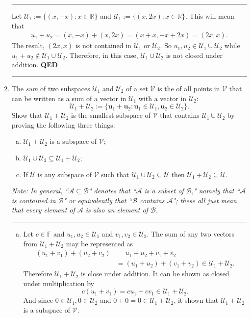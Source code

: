 \documentclass[12pt]{amsart}
\newcommand{\1}{\mathbbm{1}}
\numberwithin{equation}{section}
\numberwithin{Theorem}{section}
\theoremstyle{plain} %
\theoremstyle{definition}
\theoremstyle{remark}
\begin{document}
\begin{enumerate}[1.]
\hrule\bigskip
Let $\mathcal{U}_1 := \{(x,-x):x\in\mathbb{R}\}$ and $\mathcal{U}_1 := \{(x,2x):x\in\mathbb{R}\}$.
This will mean that
\begin{align*}
	u_1 + u_2 = (x,-x)+(x,2x) = (x+x,-x+2x) = (2x,x).
\end{align*}
The result, $(2x,x)$ is not contained in $\mathcal{U}_1$ or $\mathcal{U}_2$.
So $u_1, u_2 \in \mathcal{U}_1\cup\mathcal{U}_2$ while $u_1+ u_2 \notin \mathcal{U}_1\cup\mathcal{U}_2$. Therefore, in this case, $\mathcal{U}_1\cup\mathcal{U}_2$ is not closed under addition. \textbf{QED}
\bigskip\hrule\bigskip
\item
The \textit{sum} of two subspaces $\mathcal{U}_1$ and $\mathcal{U}_2$ of a set $\mathcal{V}$ is the of all points in $\mathcal{V}$ that can be written as a sum of a vector in $\mathcal{U}_1$ with a vector in $\mathcal{U}_2$:
\begin{equation*}
\mathcal{U}_1+\mathcal{U}_2:=\{\mathbf{u}_1+\mathbf{u}_2: \mathbf{u}_1\in\mathcal{U}_1,\mathbf{u}_2\in\mathcal{U}_2\}.
\end{equation*}
Show that $\mathcal{U}_1+\mathcal{U}_2$ is the smallest subspace of $\mathcal{V}$ that contains $\mathcal{U}_1\cup\mathcal{U}_2$ by proving the following three things:
\begin{enumerate}[(a)]
\item
$\mathcal{U}_1+\mathcal{U}_2$ is a subspace of $\mathcal{V}$;
\item
$\mathcal{U}_1\cup\mathcal{U}_2\subseteq\mathcal{U}_1+\mathcal{U}_2$;
\item
If $\mathcal{U}$ is any subspace of $\mathcal{V}$ such that $\mathcal{U}_1\cup\mathcal{U}_2\subseteq\mathcal{U}$ then $\mathcal{U}_1+\mathcal{U}_2\subseteq\mathcal{U}$.
\end{enumerate}\bigskip

\textit{Note:
In general, ``$\mathcal{A}\subseteq\mathcal{B}$" denotes that ``$\mathcal{A}$ is a subset of $\mathcal{B}$," namely that ``$\mathcal{A}$ is contained in $\mathcal{B}$" or equivalently that ``$\mathcal{B}$ contains $\mathcal{A}$"; these all just mean that every element of $\mathcal{A}$ is also an element of $\mathcal{B}$.}

\bigskip\hrule\bigskip
\begin{enumerate}[(a)]
	\item
	Let $c\in\mathbb{F}$ and $u_1,u_2\in\mathcal{U}_1$ and $v_1,v_2\in\mathcal{U}_2$.
	The sum of any two vectors from $\mathcal{U}_1+\mathcal{U}_2$ may be represented as
	\begin{align*}
	(u_1+v_1)+(u_2+v_2) 
	&= u_1+u_2+v_1+v_2 \\
	&= (u_1+u_2)+(v_1+v_2) 
	\in \mathcal{U}_1+\mathcal{U}_2.
	\end{align*}
	Therefore $\mathcal{U}_1+\mathcal{U}_2$ is close under addition. 
	It can be shown as closed under multiplication by
	$$
	c(u_1+v_1) = cu_1 + cv_1 \in\mathcal{U}_1+\mathcal{U}_2.
	$$
	And since $0\in\mathcal{U}_1, 0\in\mathcal{U}_2$ 
	and $0+0=0\in\mathcal{U}_1+\mathcal{U}_2$,
	it shown that $\mathcal{U}_1+\mathcal{U}_2$ is a subspace of $\mathcal{V}$.
	

\end{enumerate}
\end{enumerate}
\end{document}

